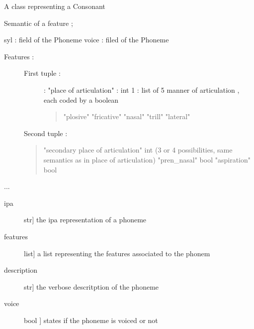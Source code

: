 \documentclass[letterpaper,10pt,english]{sphinxmanual}
\begin{document}
\begin{fulllineitems}
\label{\detokenize{index:Phoneme.Consonant}}
\sphinxAtStartPar
A class representing a Consonant

\sphinxAtStartPar
Semantic of a feature ;

\sphinxAtStartPar
syl : field of the Phoneme
voice : filed of the Phoneme
\begin{description}
\item[{Features :}] \leavevmode\begin{description}
\item[{First tuple :}] \leavevmode
{} : 
"place of articulation" : int 
1 : list of 5 manner of articulation , each coded by a boolean
\begin{quote}

\sphinxAtStartPar
"plosive"
"fricative"
"nasal"
"trill"
"lateral"
\end{quote}

\end{description}

\sphinxAtStartPar
Second tuple :
\begin{quote}

\sphinxAtStartPar
"secondary place of articulation"  int (3 or 4 possibilities, same semantics as in place of articulation)
"pren\_nasal"  bool
"aspiration" bool
\end{quote}

\end{description}

\sphinxAtStartPar
...
\begin{description}
\item[{ipa}] \leavevmode{[}str{]}
\sphinxAtStartPar
the ipa representation of a phoneme

\item[{features}] \leavevmode{[}list{]}
\sphinxAtStartPar
a list representing the features associated to the phonem

\item[{description}] \leavevmode{[}str{]}
\sphinxAtStartPar
the verbose descritption of the phoneme

\item[{voice}] \leavevmode{[}bool {]}
\sphinxAtStartPar
states if the phoneme is voiced or not


\end{description}
\end{fulllineitems}
\end{document}
